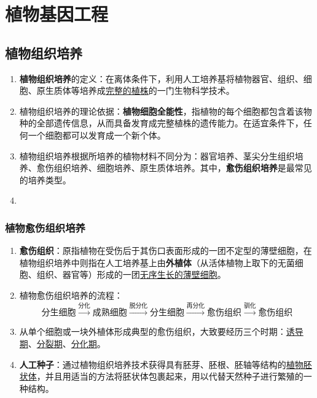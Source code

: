 \chapter{植物基因工程}
\section{植物组织培养}
\begin{enumerate}
    \item \textbf{植物组织培养}的定义：在离体条件下，利用人工培养基将植物器官、组织、细胞、原生质体等培养成\uline{完整的植株}的一门生物科学技术。
    \item 植物组织培养的理论依据：\textbf{植物细胞全能性}，指植物的每个细胞都包含着该物种的全部遗传信息，从而具备发育成完整植株的遗传能力。在适宜条件下，任何一个细胞都可以发育成一个新个体。
    \item 植物组织培养根据所培养的植物材料不同分为：器官培养、茎尖分生组织培养、愈伤组织培养、细胞培养、原生质体培养。其中，\textbf{愈伤组织培养}是最常见的培养类型。
    \item 
\end{enumerate}
\subsection{植物愈伤组织培养}
\begin{enumerate}
    \item \textbf{愈伤组织}：原指植物在受伤后于其伤口表面形成的一团不定型的薄壁细胞，在植物组织培养中则指在人工培养基上由\textbf{外植体}（从活体植物上取下的无菌细胞、组织、器官等）形成的一团\uline{无序生长的薄壁细胞}。
    \item 植物愈伤组织培养的流程：
    \[
        \text{分生细胞}\overset{\text{分化}}\longrightarrow\text{成熟细胞}\overset{\text{脱分化}}\longrightarrow\text{分生细胞}\overset{\text{再分化}}\longrightarrow\text{愈伤组织}\overset{\text{驯化}}\longrightarrow\text{愈伤组织}
    \]
    \item 从单个细胞或一块外植体形成典型的愈伤组织，大致要经历三个时期：\uline{诱导期}、\uline{分裂期}、\uline{分化期}。
    \item \textbf{人工种子}：通过植物组织培养技术获得具有胚芽、胚根、胚轴等结构的\uline{植物胚状体}，并且用适当的方法将胚状体包裹起来，用以代替天然种子进行繁殖的一种结构。
\end{enumerate}
